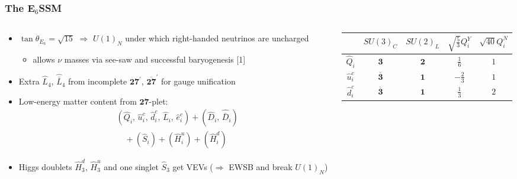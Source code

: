 \documentclass[10pt,aspectratio=169]{beamer}
\begin{document}
\begin{frame}
  \frametitle{The E$_6$SSM}
    \begin{columns}[t]
      \begin{column}{0.5\textwidth}
        \begin{itemize} \itemsep0.2em
        \item $\tan\theta_{E_6} = \sqrt{15}$ $\Rightarrow$ $U(1)_N$
          under which right-handed neutrinos are uncharged
          \begin{itemize}
            \item allows {\color{blue} $\nu$ masses via see-saw} and
              {\color{blue} successful baryogenesis} [1]
          \end{itemize}
        \item Extra $\hat{L}_4$, $\hat{\overline{L}}_4$ from incomplete
          $\mathbf{27}^\prime$, $\mathbf{\overline{27}}^\prime$ for gauge
          unification
        \item Low-energy matter content from $\mathbf{27}$-plet:
          \begin{align*}
            &(\hat{Q}_i, \, \hat{u}^c_i, \, \hat{d}^c_i, \, \hat{L}_i, \,
            \hat{e}^c_i) + (\hat{D}_i, \, \hat{\overline{D}}_i)\\
            &\quad {} + (\hat{S}_{i}) + (\hat{H}^u_i) + (\hat{H}^d_i)
          \end{align*}
        \item Higgs doublets $\hat{H}^d_3$, $\hat{H}^u_3$ and one singlet
          $\hat{S}_3$ get VEVs ($\Rightarrow$ EWSB and break $U(1)_N$)
          \vfill
        \end{itemize}
      \end{column}
      \begin{column}{0.5\textwidth}
        \vspace{-40pt}
        \begin{table}[h]
          \centering
          \begin{tabular}{ccccc}
            \toprule
            & $SU(3)_C$ & $SU(2)_L$ & $\sqrt{\frac{5}{3}} Q_i^Y$
            & $\sqrt{40} Q_i^N$ \\
            \midrule
            $\hat{Q}_i$ & $\mathbf{3}$ & $\mathbf{2}$ & $\frac{1}{6}$ & $1$ \\
            $\hat{u}_i^c$ & $\mathbf{\overline{3}}$ & $\mathbf{1}$
            & $-\frac{2}{3}$ & $1$ \\
            $\hat{d}_i^c$ & $\mathbf{\overline{3}}$ & $\mathbf{1}$
            & $\frac{1}{3}$ & $2$ \\

\end{tabular}
\end{table}
\end{column}
\end{columns}
\end{frame}
\end{document}
